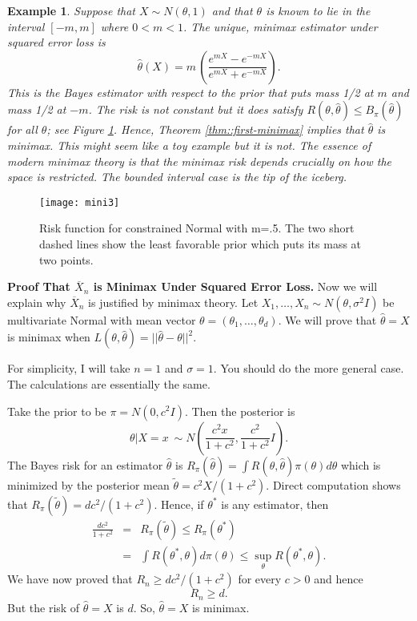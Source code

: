 \documentclass[twoside,12pt]{article}
\newtheorem{example}[theorem]{Example}
\begin{document}
\begin{example}\label{example::restricted-normal}
Suppose that $X\sim N(\theta,1)$ and that $\theta$ is known to lie
in the interval $[-m,m]$ where $0<m<1$.
The unique, minimax estimator under squared error loss is
$$
\widehat{\theta} (X) =m\, \left(\frac{e^{mX} - e^{-mX}}{e^{mX} + e^{-mX}}\right).
$$
This is the Bayes estimator with respect to the
prior that puts mass 1/2 at $m$ and mass 1/2 at $-m$.
The risk is not constant but it does satisfy
$R(\theta,\widehat{\theta}) \leq B_\pi(\widehat{\theta})$ for all $\theta$;
see Figure \ref{fig::risk-constrained-normal}.
Hence, Theorem \ref{thm::first-minimax} implies that
$\widehat\theta$ is minimax.
This might seem like a toy example but it is not.
The essence of modern minimax theory is that
the minimax risk depends crucially on how the space
is restricted. The bounded interval case is the tip of the iceberg.
\end{example}

\begin{figure}
\begin{center}
\texttt{[image: mini3]}
\end{center}
\vspace{-8in}
\caption{Risk function for constrained Normal with m=.5.
The two short dashed lines show the least favorable prior which puts its
mass at two points.}
\label{fig::risk-constrained-normal}
\end{figure}


{\bf Proof That $\overline{X}_n$ is Minimax Under Squared Error Loss.}
Now we will explain why 
$\overline{X}_n$ is justified by minimax theory.
Let $X_1,\ldots, X_n \sim N(\theta,\sigma^2 I)$
be multivariate Normal with
mean vector $\theta = (\theta_1,\ldots, \theta_d)$.
We will prove that
$\widehat\theta = X$ is minimax when 
$L(\theta,\widehat\theta) = ||\widehat\theta - \theta||^2$.

For simplicity,
I will take $n=1$ and $\sigma=1$.
You should do the more general case.
The calculations are essentially the same.

Take the prior to be $\pi=N(0,c^2 I)$.
Then the posterior is
\begin{equation}
\theta|X=x \ \sim N\left(\frac{c^2 x}{1+c^2},\frac{c^2 }{1+c^2} I\right).
\end{equation}
The Bayes risk for an estimator $\widehat\theta$ is
$R_\pi(\widehat\theta) = \int R(\theta,\widehat\theta)\pi(\theta)d\theta$
which is minimized by the posterior mean
$\tilde{\theta} = c^2 X/(1+c^2)$.
Direct computation shows that
$R_\pi(\tilde\theta) = dc^2/(1+c^2)$.
Hence,
if $\theta^*$ is any estimator, then
\begin{eqnarray}
\frac{dc^2}{1+c^2} &=&
R_\pi(\tilde\theta) \leq R_\pi(\theta^*) \\
& = &
\int R(\theta^*,\theta)d\pi(\theta) \leq
\sup_\theta R(\theta^*,\theta).
\end{eqnarray}
We have now proved that
$R_n \geq dc^2/(1+c^2)$ for every $c>0$ and hence
\begin{equation}
R_n \geq d.
\end{equation}
But the risk of $\widehat\theta = X$ is $d$.
So, $\widehat\theta = X$ is minimax.
\end{document}
